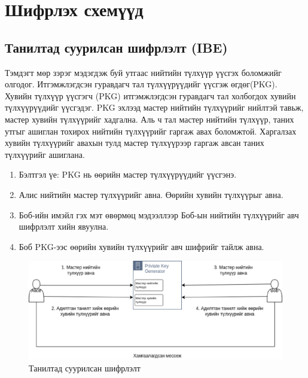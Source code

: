
\section{Шифрлэх схемүүд}

\subsection*{Танилтад суурилсан шифрлэлт (IBE)}
Тэмдэгт мөр зэрэг мэдэгдэж буй утгаас нийтийн түлхүүр үүсгэх боломжийг олгодог. Итгэмжлэгдсэн гуравдагч тал түлхүүрүүдийг үүсгэж өгдөг(PKG). 
Хувийн түлхүүр үүсгэгч (PKG) итгэмжлэгдсэн гуравдагч тал холбогдох хувийн түлхүүрүүдийг үүсгэдэг. PKG эхлээд мастер нийтийн түлхүүрийг нийлтэй тавьж, мастер хувийн түлхүүрийг хадгална. Аль ч тал мастер нийтийн түлхүүр, таних утгыг ашиглан тохирох нийтийн түлхүүрийг гаргаж авах боломжтой. Харгалзах хувийн түлхүүрийг авахын тулд мастер түлхүүрээр гаргаж авсан таних түлхүүрийг ашиглана. \cite{WikiIDE}

\begin{enumerate}
    \item Бэлтгэл үе: PKG нь өөрийн мастер түлхүүрүүдийг үүсгэнэ.
    \item Алис нийтийн мастер түлхүүрийг авна. Өөрийн хувийн түлхүүрыг авна.
    \item Боб-ийн имэйл гэх мэт өвөрмөц мэдээллээр Боб-ын нийтийн түлхүүрийг авч шифрлэлт хийн явуулна.
    \item Боб PKG-ээс өөрийн хувийн түлхүүрийг авч шифрийг тайлж авна.
\end{enumerate}


\begin{figure}[ht]
\centering
\includegraphics[scale=0.6]{Figures/IBE.eps}
\caption[IBE]{Танилтад суурилсан шифрлэлт}
\label{fig:IBE}
\end{figure}

